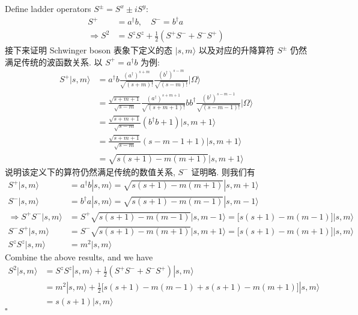 \documentclass[../../main.tex]{subfiles}
\begin{document}
\begin{enumerate}
{{  Define ladder operators $S^{\pm} = S^{x} \pm iS^{y}$:
  \begin{align*}
    S^{+} &= a^{\dagger}b, \quad S^{-} = b^{\dagger}a\\
    \Rightarrow S^{2} &= S^{z}S^{z} + \frac{1}{2}\left(S^{+}S^{-} + S^{-}S^{+}\right)
  \end{align*}
  接下来证明 Schwinger boson 表象下定义的态 $|s,m\rangle$ 以及对应的升降算符 $S^{\pm}$ 仍然满足传统的波函数关系. 以 $S^{+} = a^{\dagger}b$ 为例:
  \begin{align*}
    S^{+}|s,m\rangle &= a^{\dagger}b
    \frac{(a^{\dagger})^{s+m}}{\sqrt{(s+m)!}}
    \frac{(b^{\dagger})^{s-m}}{\sqrt{(s-m)!}}
    |\Omega\rangle \\
    &= \frac{\sqrt{s+m+1}}{\sqrt{s-m}}
    \frac{(a^{\dagger})^{s+m+1}}{\sqrt{(s+m+1)!}}
    bb^{\dagger}
    \frac{(b^{\dagger})^{s-m-1}}{\sqrt{(s-m-1)!}}
    |\Omega\rangle \\
    &= \frac{\sqrt{s+m+1}}{\sqrt{s-m}}(b^{\dagger}b + 1)|s,m+1\rangle\\
    &= \frac{\sqrt{s+m+1}}{\sqrt{s-m}}(s-m-1 + 1)|s,m+1\rangle\\
    &= \sqrt{s(s+1)-m(m+1)}|s,m+1\rangle
  \end{align*}
  说明该定义下的算符仍然满足传统的数值关系, $S^{-}$ 证明略. 则我们有
  \begin{align*}
    S^{+}|s,m\rangle &= a^{\dagger}b|s,m\rangle = \sqrt{s(s+1)-m(m+1)}|s,m+1\rangle\\
    S^{-}|s,m\rangle &= b^{\dagger}a|s,m\rangle = \sqrt{s(s+1)-m(m-1)}|s,m-1\rangle\\
    \Rightarrow 
    S^{+}S^{-}|s,m\rangle &= S^{+}\sqrt{s(s+1)-m(m-1)}|s,m-1\rangle = \bigg[s(s+1)-m(m-1)\bigg]|s,m\rangle\\
    S^{-}S^{+}|s,m\rangle &= S^{-}\sqrt{s(s+1)-m(m+1)}|s,m+1\rangle = \bigg[s(s+1)-m(m+1)\bigg]|s,m\rangle\\
    S^{z}S^{z}|s,m\rangle &= m^{2}|s,m\rangle
  \end{align*}
  Combine the above results, and we have
  \begin{align*}
    S^{2}|s,m\rangle &= S^{z}S^{z}|s,m\rangle + \frac{1}{2}\left(S^{+}S^{-} + S^{-}S^{+}\right)|s,m\rangle\\
    &= m^{2}|s,m\rangle + \frac{1}{2}\bigg[s(s+1)-m(m-1) + s(s+1)-m(m+1)\bigg]|s,m\rangle\\
    &= \boxed{s(s+1)|s,m\rangle}
  \end{align*}}}
  $\square$
\end{enumerate}
\end{document}
